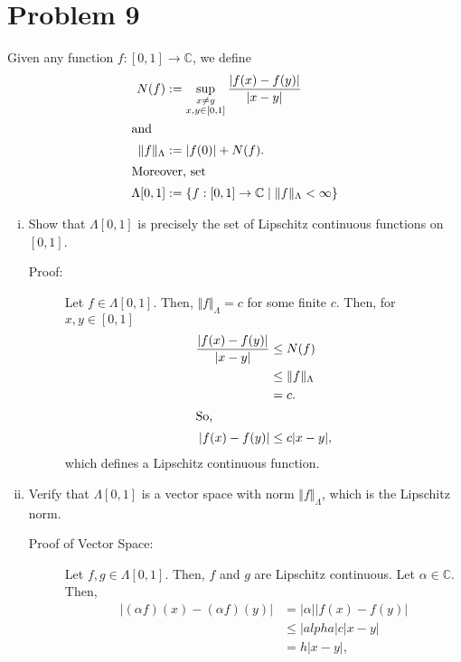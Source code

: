\documentclass[10pt]{extarticle}
\begin{document}
  \section{Problem 9}%
  Given any function $f: [0,1]\rightarrow \mathbb{C}$, we define
  \begin{align*}
    N(f) &:= \sup_{\substack{x\neq y\\ x,y\in[0,1]}}\frac{|f(x)-f(y)|}{|x-y|}\\
    \shortintertext{and}
    \Vert f\Vert_{\Lambda} &:= |f(0)| + N(f).\\
    \shortintertext{Moreover, set}
    \Lambda[0,1] &:= \left\{f: [0,1]\rightarrow \mathbb{C}\mid \Vert f\Vert_{\Lambda} < \infty\right\}
  \end{align*}
  \begin{enumerate}[(i)]
    \item Show that $\Lambda[0,1]$ is precisely the set of Lipschitz continuous functions on $[0,1]$.
      \begin{description}
        \item[Proof:] Let $f\in \Lambda[0,1]$. Then, $\Vert f\Vert_{\Lambda} = c$ for some finite $c$. Then, for $x,y\in [0,1]$
          \begin{align*}
            \frac{|f(x)-f(y)|}{|x-y|}&\leq N(f)\\
                                     &\leq \Vert f\Vert_{\Lambda}\\
                                     &= c.\\
                                     \shortintertext{So,}
            |f(x)-f(y)| &\leq c|x-y|,
          \end{align*}
          which defines a Lipschitz continuous function.
      \end{description}
    \item Verify that $\Lambda[0,1]$ is a vector space with norm $\Vert f\Vert_{\Lambda}$, which is the Lipschitz norm.
      \begin{description}
        \item[Proof of Vector Space:] Let $f,g\in \Lambda[0,1]$. Then, $f$ and $g$ are Lipschitz continuous. Let $\alpha\in \mathbb{C}$. Then,
          \begin{align*}
            |(\alpha f)(x) - (\alpha f)(y)| &= |\alpha||f(x)-f(y)|\\
                                            &\leq |alpha|c|x-y|\\
                                            &= h|x-y|,\\

\end{align*}
\end{description}
\end{enumerate}
\end{document}
